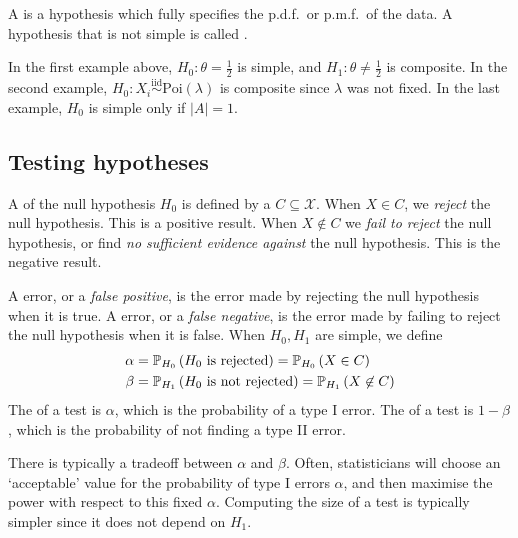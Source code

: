 \begin{definition}
	A  is a hypothesis which fully specifies the p.d.f.\ or p.m.f.\ of the data.
	A hypothesis that is not simple is called .
\end{definition}

\begin{example}
	In the first example above, $H_0 \colon \theta = \frac{1}{2}$ is simple, and $H_1 \colon \theta \neq \frac{1}{2}$ is composite.
	In the second example, $H_0 \colon X_i \overset{\mathrm{iid}}{\sim} \mathrm{Poi}(\lambda)$ is composite since $\lambda$ was not fixed.
	In the last example, $H_0$ is simple only if $|A| = 1$.
\end{example}

\subsection{Testing hypotheses}
\begin{definition}
	A  of the null hypothesis $H_0$ is defined by a  $C \subseteq \mathcal X$.
	When $X \in C$, we \textit{reject} the null hypothesis.
	This is a positive result.
	When $X \not\in C$ we \textit{fail to reject} the null hypothesis, or find \textit{no sufficient evidence against} the null hypothesis.
	This is the negative result.
\end{definition}

\begin{definition}
	A  error, or a \textit{false positive}, is the error made by rejecting the null hypothesis when it is true.
	A  error, or a \textit{false negative}, is the error made by failing to reject the null hypothesis when it is false.
	When $H_0, H_1$ are simple, we define
	\begin{align*}
		\alpha &= \mathbb{P}_{H_0}\left({H_0 \text{ is rejected}}\right) = \mathbb{P}_{H_0}\left({X \in C}\right) \\
		\beta &= \mathbb{P}_{H_1}\left({H_0 \text{ is not rejected}}\right) = \mathbb{P}_{H_1}\left({X \not\in C}\right)
	\end{align*}
	The  of a test is $\alpha$, which is the probability of a type I error.
	The  of a test is $1 - \beta$, which is the probability of not finding a type II error.
\end{definition}

\begin{remark}
	There is typically a tradeoff between $\alpha$ and $\beta$.
	Often, statisticians will choose an `acceptable' value for the probability of type I errors $\alpha$, and then maximise the power with respect to this fixed $\alpha$.
	Computing the size of a test is typically simpler since it does not depend on $H_1$.
\end{remark} 

